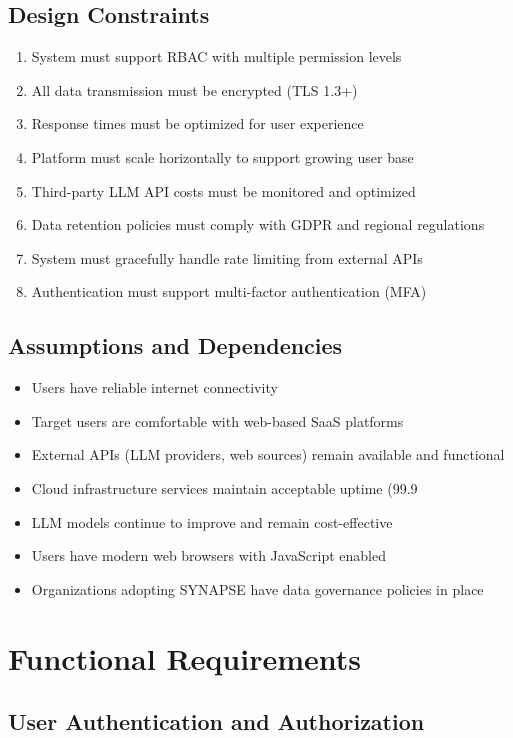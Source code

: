 \documentclass{report}
\begin{document}
\section{Design Constraints}
\begin{enumerate}
    \item System must support RBAC with multiple permission levels
    \item All data transmission must be encrypted (TLS 1.3+)
    \item Response times must be optimized for user experience
    \item Platform must scale horizontally to support growing user base
    \item Third-party LLM API costs must be monitored and optimized
    \item Data retention policies must comply with GDPR and regional regulations
    \item System must gracefully handle rate limiting from external APIs
    \item Authentication must support multi-factor authentication (MFA)
\end{enumerate}

\section{Assumptions and Dependencies}
\begin{itemize}
    \item Users have reliable internet connectivity
    \item Target users are comfortable with web-based SaaS platforms
    \item External APIs (LLM providers, web sources) remain available and functional
    \item Cloud infrastructure services maintain acceptable uptime (99.9%
    \item LLM models continue to improve and remain cost-effective
    \item Users have modern web browsers with JavaScript enabled
    \item Organizations adopting SYNAPSE have data governance policies in place
\end{itemize}

\chapter{Functional Requirements}

\section{User Authentication and Authorization}
\end{document}
